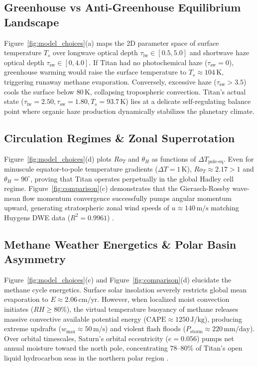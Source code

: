 \documentclass[11pt,a4paper]{article}
\begin{document}
\subsection{Greenhouse vs Anti-Greenhouse Equilibrium Landscape}
Figure~\ref{fig:model_choices}(a) maps the 2D parameter space of surface temperature $T_s$ over longwave optical depth $\tau_{\mathrm{lw}} \in [0.5, 5.0]$ and shortwave haze optical depth $\tau_{\mathrm{sw}} \in [0, 4.0]$. If Titan had no photochemical haze ($\tau_{\mathrm{sw}} = 0$), greenhouse warming would raise the surface temperature to $T_s \approx 104\,\mathrm{K}$, triggering runaway methane evaporation. Conversely, excessive haze ($\tau_{\mathrm{sw}} > 3.5$) cools the surface below $80\,\mathrm{K}$, collapsing tropospheric convection. Titan's actual state ($\tau_{\mathrm{lw}} = 2.50, \tau_{\mathrm{sw}} = 1.80, T_s = 93.7\,\mathrm{K}$) lies at a delicate self-regulating balance point where organic haze production dynamically stabilizes the planetary climate.

\subsection{Circulation Regimes \& Zonal Superrotation}
Figure~\ref{fig:model_choices}(d) plots $Ro_T$ and $\theta_H$ as functions of $\Delta T_{\mathrm{pole\text{-}eq}}$. Even for minuscule equator-to-pole temperature gradients ($\Delta T = 1\,\mathrm{K}$), $Ro_T \approx 2.17 > 1$ and $\theta_H = 90^\circ$, proving that Titan operates perpetually in the global Hadley cell regime. Figure~\ref{fig:comparison}(c) demonstrates that the Gierasch-Rossby wave-mean flow momentum convergence successfully pumps angular momentum upward, generating stratospheric zonal wind speeds of $u \approx 140\,\mathrm{m/s}$ matching Huygens DWE data ($R^2 = 0.9961$) \cite{bird2005}.

\subsection{Methane Weather Energetics \& Polar Basin Asymmetry}
Figure~\ref{fig:model_choices}(c) and Figure~\ref{fig:comparison}(d) elucidate the methane cycle energetics. Surface solar insolation severely restricts global mean evaporation to $E \approx 2.06\,\mathrm{cm/yr}$. However, when localized moist convection initiates ($RH \ge 80\%$), the virtual temperature buoyancy of methane releases massive convective available potential energy ($\mathrm{CAPE} \approx 1250\,\mathrm{J/kg}$), producing extreme updrafts ($w_{\mathrm{max}} \approx 50\,\mathrm{m/s}$) and violent flash floods ($P_{\mathrm{storm}} \approx 220\,\mathrm{mm/day}$). Over orbital timescales, Saturn's orbital eccentricity ($e = 0.056$) pumps net annual moisture toward the north pole, concentrating $78\text{--}80\%$ of Titan's open liquid hydrocarbon seas in the northern polar region \cite{aharonson2009}.
\end{document}
